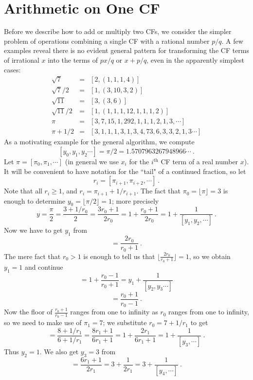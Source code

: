 \documentclass[11pt, oneside]{amsart}   	%
\renewcommand{\:}{\negthickspace:\negthickspace}
\begin{document}
\section{Arithmetic on One CF}
Before we describe how to add or multiply two CFs, we consider the simpler problem of operations combining a single CF with a
rational number $p/q$. A few examples reveal there is no evident general pattern for transforming the CF terms of irrational $x$ into
the terms of $px/q$ or $x + p/q$, even in the apparently simplest cases:
\begin{eqnarray*}
\sqrt{7} & = & [2, (1, 1, 1, 4)] \\
\sqrt{7}/2 & = & [1, (3, 10, 3, 2)] \\
\sqrt{11} & = & [3, (3, 6)] \\
\sqrt{11}/2 & = & [1, (1, 1, 1, 12, 1, 1, 1, 2)] \\
\pi & = & [3,7,15,1,292,1,1,1, 2, 1, 3,\cdots]\\
\pi + 1/2 & = & [3, 1, 1, 1, 3, 1, 3, 4, 73, 6, 3, 3, 2, 1, 3\cdots]
\end{eqnarray*}
As a motivating example for the general algorithm, we compute
\[[y_0,y_1,y_2 \cdots] = \pi/2 = 1.5707963267948966\cdots\ .
\]
Let $\pi = [\pi_0,\pi_1,\cdots]$ (in general we use $x_i$ for the $i^{\mbox {th}}$ CF term of a real number $x$). It will be convenient to have notation for the ``tail" of a continued fraction, so let
\[
r_i = [\pi_{i+1}, \pi_{i+2},\cdots]\ .
\]
Note that all $r_i \geq 1$, and $r_i = \pi_{i+1} + 1/r_{i+1}$. The fact that $\pi_0 = \lfloor \pi \rfloor= 3$
is enough to determine $y_0=\lfloor \pi/2 \rfloor=1$; more precisely
\begin{equation*}
y = \frac{\pi}{2} = \frac{3 + 1/r_0}{2} = \frac{3r_0+1}{2r_0} = 1 + \frac{r_0+1}{2r_0}= 1 + \frac{1}{[y_1,y_2,\cdots]}\ .
\end{equation*}
Now we have to get $y_1$ from 
\begin{equation*}
[y_1,y_2,\cdots] = \frac{2r_0}{r_0+1}\ .
\end{equation*}
The mere fact that $r_0>1$ is enough to tell us that $\lfloor \frac{2r_0}{r_0+1} \rfloor = 1$, so we obtain $y_1=1$ and continue
\begin{equation*}
[y_1,y_2,\cdots] = 1 + \frac{r_0-1}{r_0+1} = y_1 + \frac{1}{[y_2,y_3\cdots]}
\end{equation*}
\begin{equation*}
[y_2,\cdots] = \frac{r_0+1}{r_0-1} \ .
\end{equation*}
Now the floor of $\frac{r_0+1}{r_0-1}$ ranges from one to infinity as $r_0$ ranges from one to infinity,
so we need to make use of $\pi_1 = 7$; we substitute $r_0 = 7+1/r_1$ to get
\begin{equation*}
[y_2,\cdots] = \frac{8 + 1/r_1}{6 + 1/r_1} = \frac{8r_1 + 1}{6r_1 + 1} = 1 + \frac{2r_1}{6r_1 + 1}= 1 + \frac{1}{[y_3,\cdots]}\ .
\end{equation*}
Thus $y_2=1$.  We also get $y_3 = 3$ from
\begin{equation*}
[y_3,\cdots] =  \frac{6r_1 + 1}{2r_1} = 3 + \frac{1}{2r_1} = 3 + \frac{1}{[y_4,\cdots]}\ .
\end{equation*}
\end{document}
